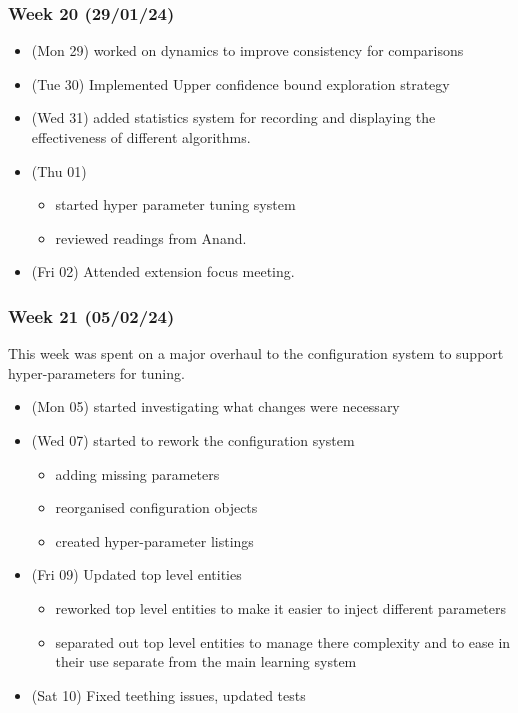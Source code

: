 \hypertarget{week-20-290124}{%
\subsubsection{Week 20 (29/01/24)}\label{week-20-290124}}

\begin{itemize}
\tightlist
\item
  (Mon 29) worked on dynamics to improve consistency for comparisons
\item
  (Tue 30) Implemented Upper confidence bound exploration strategy
\item
  (Wed 31) added statistics system for recording and displaying the
  effectiveness of different algorithms.
\item
  (Thu 01)

  \begin{itemize}
  \tightlist
  \item
    started hyper parameter tuning system
  \item
    reviewed readings from Anand.
  \end{itemize}
\item
  (Fri 02) Attended extension focus meeting.
\end{itemize}

\hypertarget{week-21-050224}{%
\subsubsection{Week 21 (05/02/24)}\label{week-21-050224}}

This week was spent on a major overhaul to the configuration system to
support hyper-parameters for tuning.

\begin{itemize}
\tightlist
\item
  (Mon 05) started investigating what changes were necessary
\item
  (Wed 07) started to rework the configuration system

  \begin{itemize}
  \tightlist
  \item
    adding missing parameters
  \item
    reorganised configuration objects
  \item
    created hyper-parameter listings
  \end{itemize}
\item
  (Fri 09) Updated top level entities

  \begin{itemize}
  \tightlist
  \item
    reworked top level entities to make it easier to inject different
    parameters
  \item
    separated out top level entities to manage there complexity and to
    ease in their use separate from the main learning system
  \end{itemize}
\item
  (Sat 10) Fixed teething issues, updated tests
\end{itemize}

